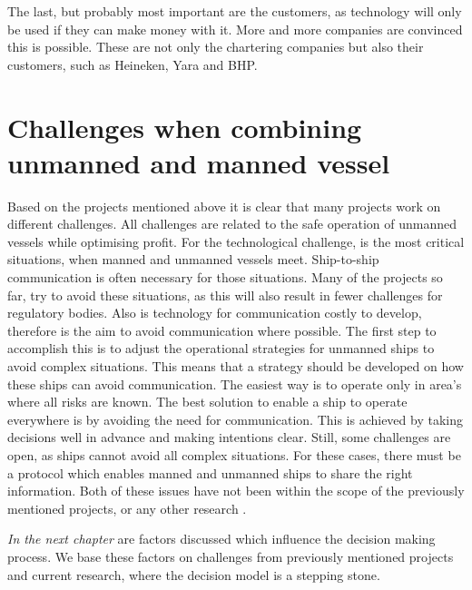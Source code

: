 The last, but probably most important are the customers, as technology will only be used if they can make money with it. More and more companies are convinced this is possible. These are not only the chartering companies but also their customers, such as Heineken, Yara and BHP.

\section{Challenges when combining unmanned and manned vessel}
\label{sec:challenges-future}
Based on the projects mentioned above it is clear that many projects work on different challenges. All challenges are related to the safe operation of unmanned vessels while optimising profit. For the technological challenge, is the most critical situations, when manned and unmanned vessels meet. Ship-to-ship communication is often necessary for those situations. Many of the projects so far, try to avoid these situations, as this will also result in fewer challenges for regulatory bodies. Also is technology for communication costly to develop, therefore is the aim to avoid communication where possible. The first step to accomplish this is to adjust the operational strategies for unmanned ships to avoid complex situations. This means that a strategy should be developed on how these ships can avoid communication. The easiest way is to operate only in area's where all risks are known. The best solution to enable a ship to operate everywhere is by avoiding the need for communication. This is achieved by taking decisions well in advance and making intentions clear. Still, some challenges are open, as ships cannot avoid all complex situations. For these cases, there must be a protocol which enables manned and unmanned ships to share the right information. Both of these issues have not been within the scope of the previously mentioned projects, or any other research \cite{Kooij2018}. 

\vspace{1.5cm}
\emph{In the next chapter} are factors discussed which influence the decision making process. We base these factors on challenges from previously mentioned projects and current research, where the decision model is a stepping stone.